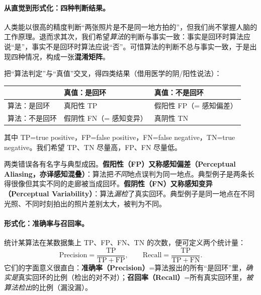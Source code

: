 \paragraph{从直觉到形式化：四种判断结果。}
人类能以很高的精度判断“两张照片是不是同一地方拍的”，但我们尚不掌握人脑的工作原理\cite{gaoxiang2019slam14}。退而求其次，我们希望\emph{算法}的判断与事实一致：事实是回环时算法应说“是”，事实不是回环时算法应说“否”。可惜算法的判断不总与事实一致，于是出现四种情况，构成一张\textbf{混淆矩阵}。

\begin{definition}[回环检测的混淆矩阵]\label{def:loop-confusion}
把“算法判定”与“真值”交叉，得四类结果（借用医学的阴/阳性说法）：
\begin{center}
\small
\begin{tabular}{lll}
\toprule
 & 真值：是回环 & 真值：不是回环 \\
\midrule
算法：是回环 & 真阳性 TP & 假阳性 FP（= 感知偏差）\\
算法：不是回环 & 假阴性 FN（= 感知变异）& 真阴性 TN \\
\bottomrule
\end{tabular}
\end{center}
其中 TP=true positive，FP=false positive，FN=false negative，TN=true negative。我们希望 TP、TN 尽量高，FP、FN 尽量低。
\end{definition}

\noindent 两类错误各有名字与典型成因\cite{gaoxiang2019slam14}。\textbf{假阳性（FP）又称感知偏差（Perceptual Aliasing，亦译感知混叠）}：算法把\emph{不同}地点误判为同一地点。典型例子是两条长得很像但其实不同的走廊被当成回环。\textbf{假阴性（FN）又称感知变异（Perceptual Variability）}：算法\emph{漏检}了真实回环。典型例子是同一地点在不同光照、不同时刻拍出的照片差别太大，被判为不同。

\paragraph{形式化：准确率与召回率。}
统计某算法在某数据集上 TP、FP、FN、TN 的次数，便可定义两个统计量\cite{gaoxiang2019slam14}：
\begin{equation}
  \mathrm{Precision}=\frac{\mathrm{TP}}{\mathrm{TP}+\mathrm{FP}},\qquad
  \mathrm{Recall}=\frac{\mathrm{TP}}{\mathrm{TP}+\mathrm{FN}}.
  \label{eq:loop-pr}
\end{equation}
它们的字面意义很直白：\textbf{准确率（Precision）}=算法报出的所有“是回环”里，\emph{确实是}真实回环的比例（检出的对不对）；\textbf{召回率（Recall）}=所有真实回环里，\emph{被算法检出}的比例（漏没漏）。

